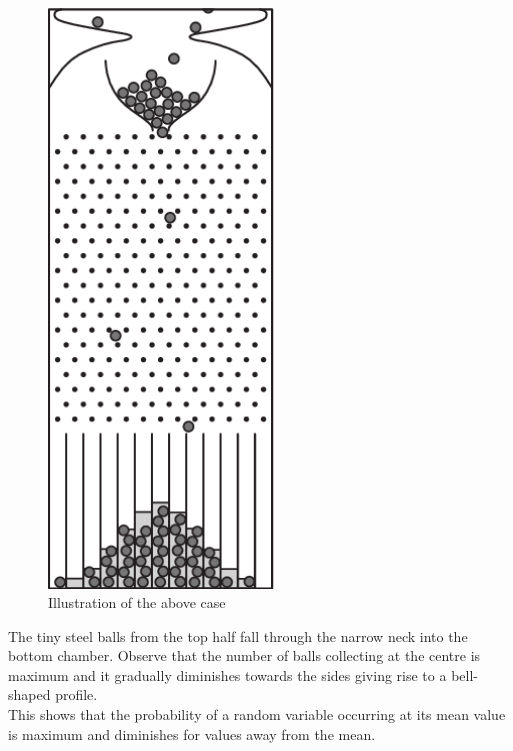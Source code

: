  \begin{figure}[htbp]
    \centerline{\includegraphics[width=6cm]{mm20b017.png}}
    \caption{Illustration of the above case}
    \label{fig:mesh1}
\end{figure}

The tiny steel balls from the top half fall through the narrow neck into the bottom chamber. Observe that the number of balls collecting at the centre is maximum and it gradually diminishes towards the sides giving rise to a bell-shaped profile.
 \\ This shows that the probability of a random variable occurring at its mean value is maximum and diminishes for values away from the mean.
 \cite{enwiki:1026848272}
 \cite{article}
